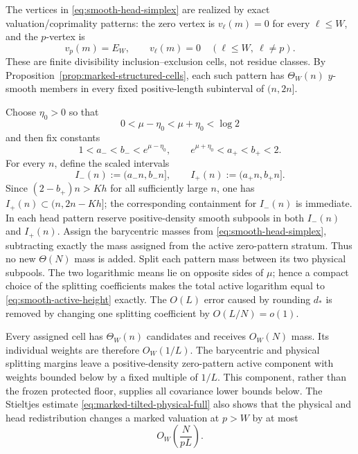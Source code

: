 \documentclass[11pt]{article}
\numberwithin{equation}{section}
\theoremstyle{definition}
\theoremstyle{remark}
\newcommand{\1}{\mathbf 1}
\begin{document}
The vertices in \eqref{eq:smooth-head-simplex} are realized by exact
valuation/coprimality patterns: the zero vertex is
\(v_\ell(m)=0\) for every \(\ell\leq W\), and the \(p\)-vertex is
\[
 v_p(m)=E_W,\qquad v_\ell(m)=0
       \quad(\ell\leq W,\ \ell\ne p).
\]
These are finite divisibility inclusion--exclusion cells, not residue
classes.  By Proposition~\ref{prop:marked-structured-cells}, each such pattern has
\(\Theta_W(n)\) \(y\)-smooth members in every fixed positive-length
subinterval of \((n,2n]\).

Choose \(\eta_0>0\) so that
\[
 0<\mu-\eta_0<\mu+\eta_0<\log2
\]
and then fix constants
\begin{equation}
 1<a_-<b_-<e^{\mu-\eta_0},\qquad
 e^{\mu+\eta_0}<a_+<b_+<2.
 \label{eq:smooth-scaled-physical-constants}
\end{equation}
For every \(n\), define the scaled intervals
\begin{equation}
 I_-(n):=(a_-n,b_-n],\qquad I_+(n):=(a_+n,b_+n].
 \label{eq:smooth-scaled-physical-intervals}
\end{equation}
Since \((2-b_+)n>Kh\) for all sufficiently large \(n\), one has
\(I_+(n)\subset(n,2n-Kh]\); the corresponding containment for
\(I_-(n)\) is immediate.  In each head pattern reserve positive-density
smooth subpools in both \(I_-(n)\) and \(I_+(n)\).  Assign the barycentric masses from
\eqref{eq:smooth-head-simplex}, subtracting exactly the mass assigned
from the active zero-pattern stratum.  Thus no new \(\Theta(N)\) mass is
added.  Split each pattern mass between its two physical subpools.  The
two logarithmic means lie on opposite sides of \(\mu\); hence a compact
choice of the splitting coefficients makes the total active logarithm
equal to \eqref{eq:smooth-active-height} exactly.  The \(O(L)\) error
caused by rounding \(d_*\) is removed by changing one splitting
coefficient by \(O(L/N)=o(1)\).

Every assigned cell has \(\Theta_W(n)\) candidates and receives
\(O_W(N)\) mass.  Its individual weights are therefore \(O_W(1/L)\).
The barycentric and physical splitting margins leave a positive-density
zero-pattern active component with weights bounded below by a fixed
multiple of \(1/L\).  This component, rather than the frozen protected
floor, supplies all covariance lower bounds below.  The Stieltjes estimate
\eqref{eq:marked-tilted-physical-full} also shows that the physical and
head redistribution changes a marked valuation at \(p>W\) by at most
\begin{equation}
                         O_W\!\left(\frac{N}{pL}\right).
\label{eq:smooth-head-physical-marked-cost}
\end{equation}
\end{document}

